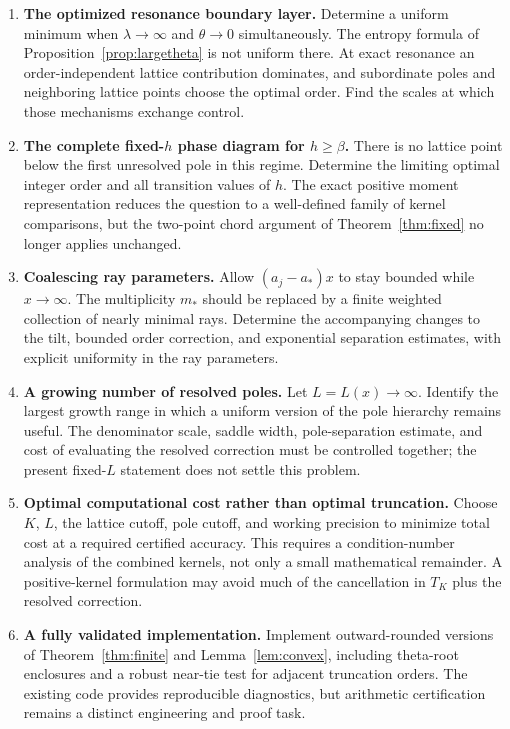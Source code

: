 \documentclass[11pt,a4paper]{article}
\numberwithin{equation}{section}
\theoremstyle{definition}\newtheorem{definition}[theorem]{Definition}
\theoremstyle{remark}\newtheorem{remark}[theorem]{Remark}
\begin{document}
\begin{enumerate}[leftmargin=*,label=\textbf{Q\arabic*.},itemsep=7pt]
\item \textbf{The optimized resonance boundary layer.}
Determine a uniform minimum when $\lambda\to\infty$ and
$\theta\to0$ simultaneously. The entropy formula of
Proposition~\ref{prop:largetheta} is not uniform there. At exact resonance
an order-independent lattice contribution dominates, and subordinate
poles and neighboring lattice points choose the optimal order. Find the
scales at which those mechanisms exchange control.

\item \textbf{The complete fixed-$h$ phase diagram for $h\ge\beta$.}
There is no lattice point below the first unresolved pole in this regime.
Determine the limiting optimal integer order and all transition values of
$h$. The exact positive moment representation reduces the question to a
well-defined family of kernel comparisons, but the two-point chord
argument of Theorem~\ref{thm:fixed} no longer applies unchanged.

\item \textbf{Coalescing ray parameters.}
Allow $(a_j-a_*)x$ to stay bounded while $x\to\infty$. The multiplicity
$m_*$ should be replaced by a finite weighted collection of nearly
minimal rays. Determine the accompanying changes to the tilt, bounded
order correction, and exponential separation estimates, with explicit
uniformity in the ray parameters.

\item \textbf{A growing number of resolved poles.}
Let $L=L(x)\to\infty$. Identify the largest growth range in which a
uniform version of the pole hierarchy remains useful. The denominator
scale, saddle width, pole-separation estimate, and cost of evaluating the
resolved correction must be controlled together; the present fixed-$L$
statement does not settle this problem.

\item \textbf{Optimal computational cost rather than optimal truncation.}
Choose $K$, $L$, the lattice cutoff, pole cutoff, and working precision to
minimize total cost at a required certified accuracy. This requires a
condition-number analysis of the combined kernels, not only a small
mathematical remainder. A positive-kernel formulation may avoid much of
the cancellation in $T_K$ plus the resolved correction.

\item \textbf{A fully validated implementation.}
Implement outward-rounded versions of Theorem~\ref{thm:finite} and
Lemma~\ref{lem:convex}, including theta-root enclosures and a robust
near-tie test for adjacent truncation orders. The existing code provides
reproducible diagnostics, but arithmetic certification remains a distinct
engineering and proof task.


\end{enumerate}
\end{document}
